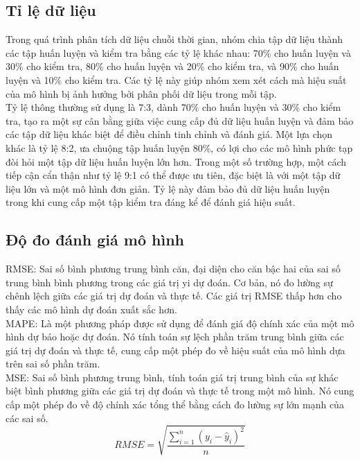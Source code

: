 \documentclass[conference]{IEEEtran}
\begin{document}
	\subsection{Tỉ lệ dữ liệu}
	Trong quá trình phân tích dữ liệu chuỗi thời gian, nhóm chia tập dữ liệu thành các tập huấn luyện và kiểm tra bằng các tỷ lệ khác nhau: 70\% cho huấn luyện và 30\% cho kiểm tra, 80\% cho huấn luyện và 20\% cho kiểm tra, và 90\% cho huấn luyện và 10\% cho kiểm tra. Các tỷ lệ này giúp nhóm xem xét cách mà hiệu suất của mô hình bị ảnh hưởng bởi phân phối dữ liệu trong mỗi tập.\\
	
	Tỷ lệ thông thường sử dụng là 7:3, dành 70\% cho huấn luyện và 30\% cho kiểm tra, tạo ra một sự cân bằng giữa việc cung cấp đủ dữ liệu huấn luyện và đảm bảo các tập dữ liệu khác biệt để điều chỉnh tinh chỉnh và đánh giá. Một lựa chọn khác là tỷ lệ 8:2, ưa chuộng tập huấn luyện 80\%, có lợi cho các mô hình phức tạp đòi hỏi một tập dữ liệu huấn luyện lớn hơn. Trong một số trường hợp, một cách tiếp cận cẩn thận như tỷ lệ 9:1 có thể được ưu tiên, đặc biệt là với một tập dữ liệu lớn và một mô hình đơn giản. Tỷ lệ này đảm bảo đủ dữ liệu huấn luyện trong khi cung cấp một tập kiểm tra đáng kể để đánh giá hiệu suất.
	
	\subsection{Độ đo đánh giá mô hình}
	RMSE: Sai số bình phương trung bình căn, đại diện cho căn bậc hai của sai số trung bình bình phương trong các giá trị yi dự đoán. Cơ bản, nó đo lường sự chênh lệch giữa các giá trị dự đoán và thực tế. Các giá trị RMSE thấp hơn cho thấy các mô hình dự đoán xuất sắc hơn.\\
	
	MAPE: Là một phương pháp được sử dụng để đánh giá độ chính xác của một mô hình dự báo hoặc dự đoán. Nó tính toán sự lệch phần trăm trung bình giữa các giá trị dự đoán và thực tế, cung cấp một phép đo về hiệu suất của mô hình dựa trên sai số phần trăm.\\
	
	MSE: Sai số bình phương trung bình, tính toán giá trị trung bình của sự khác biệt bình phương giữa các giá trị dự đoán và thực tế trong một mô hình. Nó cung cấp một phép đo về độ chính xác tổng thể bằng cách đo lường sự lớn mạnh của các sai số.\\
	
	\[RMSE = \sqrt{\frac{\sum_{i=1}^{n} (y_i - \hat{y}_i)^2}{n}}\]\\
	
\end{document}
